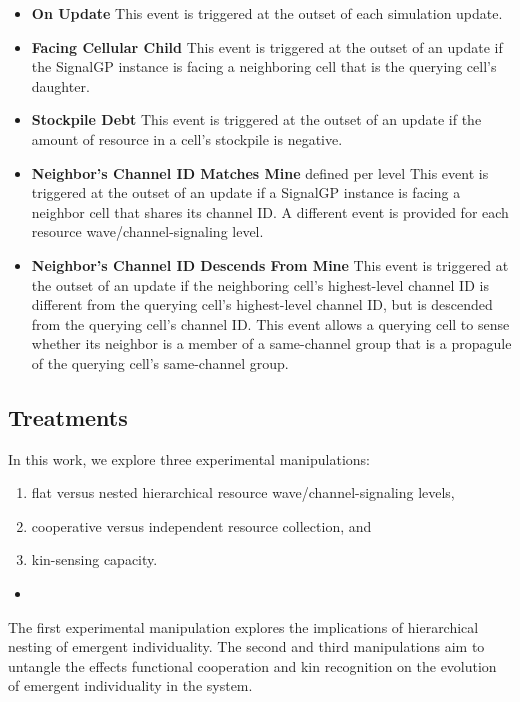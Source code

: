 \begin{itemize}
\item \textbf{On Update}
This event is triggered at the outset of each simulation update.
\item \textbf{Facing Cellular Child}
This event is triggered at the outset of an update if the SignalGP instance is facing a neighboring cell that is the querying cell's daughter.
\item \textbf{Stockpile Debt}
This event is triggered at the outset of an update if the amount of resource in a cell's stockpile is negative.
\item \textbf{Neighbor's Channel ID Matches Mine} defined per level
This event is triggered at the outset of an update if a SignalGP instance is facing a neighbor cell that shares its channel ID.
A different event is provided for each resource wave/channel-signaling level.
\item \textbf{Neighbor's Channel ID Descends From Mine}
This event is triggered at the outset of an update if the neighboring cell's highest-level channel ID is different from the querying cell's highest-level channel ID, but is descended from the querying cell's channel ID.
This event allows a querying cell to sense whether its neighbor is a member of a same-channel group that is a propagule of the querying cell's same-channel group.
\end{itemize}

\subsection{Treatments}

In this work, we explore three experimental manipulations:
\begin{enumerate}
\item flat versus nested hierarchical resource wave/channel-signaling levels,
\item cooperative versus independent resource collection, and
\item kin-sensing capacity.
\end{enumerate}

\begin{itemize}
\item
\end{itemize}

The first experimental manipulation explores the implications of hierarchical nesting of emergent individuality.
The second and third manipulations aim to untangle the effects functional cooperation and kin recognition on the evolution of emergent individuality in the system.

